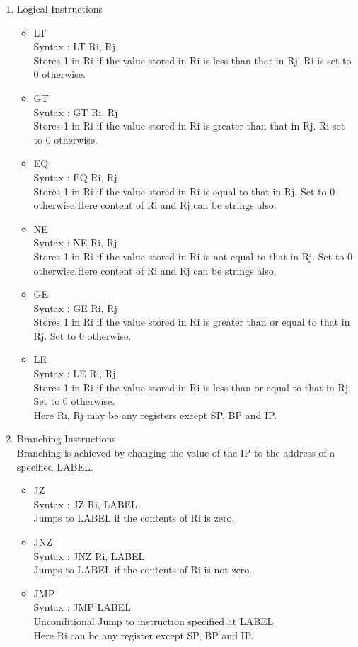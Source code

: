 \documentclass[11pt]{article}
\begin{document}
\begin{enumerate}
\item Logical Instructions
\begin{itemize}
\item LT\\
Syntax : LT Ri, Rj\\
Stores 1 in Ri if the value stored in Ri is less than that in Rj. Ri is set to 0 otherwise.
\item GT\\
Syntax : GT Ri, Rj\\
Stores 1 in Ri if the value stored in Ri is greater than that in Rj. Ri set to 0 otherwise.
\item EQ\\
Syntax : EQ Ri, Rj\\
Stores 1 in Ri if the value stored in Ri is equal to that in Rj. Set to 0 otherwise.Here content of Ri and Rj can be strings also.
\item NE\\
Syntax : NE Ri, Rj\\
Stores 1 in Ri if the value stored in Ri is not equal to that in Rj. Set to 0 otherwise.Here content of Ri and Rj can be strings also.
\item GE\\
Syntax : GE Ri, Rj\\
Stores 1 in Ri if the value stored in Ri is greater than or equal to that in Rj. Set to 0 otherwise.
\item LE\\
Syntax : LE Ri, Rj\\
Stores 1 in Ri if the value stored in Ri is less than or equal to that in Rj. Set to 0 otherwise.\\
Here Ri, Rj may be any registers except SP, BP and IP.
\end{itemize}

\item Branching Instructions\\
Branching is achieved by changing the value of the IP to the address of a specified LABEL. 
\begin{itemize}
\item JZ\\
Syntax : JZ Ri, LABEL\\
Jumps to LABEL if the contents of Ri is zero.
\item JNZ\\
Syntax : JNZ Ri, LABEL\\
Jumps to LABEL if the contents of Ri is not zero.
\item JMP\\
Syntax : JMP LABEL\\
Unconditional Jump to instruction specified at LABEL\\
Here Ri can be any register except SP, BP and IP.
\end{itemize}


\end{enumerate}
\end{document}
